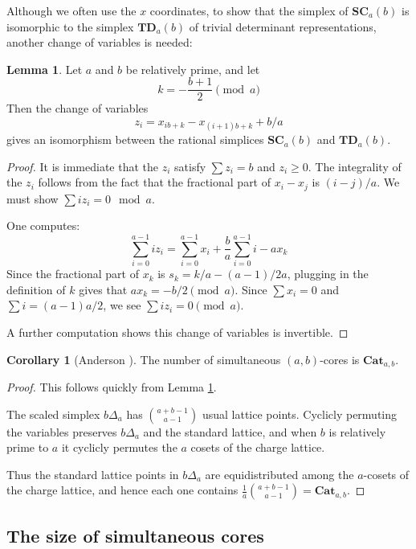 \documentclass{amsart}[12pt]
\theoremstyle{definition}
\newtheorem{lemma}[dummy]{Lemma}
\newtheorem{corollary}[dummy]{Corollary}
\newcommand{\SC}{\mathbf{SC}}
\newcommand{\TD}{\mathbf{TD}}
\newcommand{\Cat}{\mathbf{Cat}}
\begin{document}
Although we often use the $x$ coordinates, to show that the simplex of $\SC_a(b)$ is isomorphic to the simplex $\TD_a(b)$ of trivial determinant representations, another change of variables is needed:
 
\begin{lemma} \label{lem:standardsimplex}
Let $a$ and $b$ be relatively prime, and let 
$$k=-\frac{b+1}{2}\pmod a$$
  Then the change of variables
$$z_i=x_{ib+k}-x_{(i+1)b+k}+b/a$$
gives an isomorphism between the rational simplices $\SC_a(b)$ and $\TD_a(b)$. 
\end{lemma}

\begin{proof}
It is immediate that the $z_i$ satisfy $\sum z_i=b$ and $z_i\geq 0$.  The integrality of the $z_i$ follows from the fact that the fractional part of $x_i-x_j$ is $(i-j)/a$.  We must show $\sum iz_i=0\mod a$.

One computes:
$$\sum_{i=0}^{a-1} iz_i=\sum_{i=0}^{a-1} x_i+\frac{b}{a}\sum_{i=0}^{a-1} i -ax_k$$
Since the fractional part of $x_k$ is $s_k=k/a-(a-1)/2a$, plugging in the definition of $k$ gives that $ax_k=-b/2\pmod a$.  Since $\sum x_i=0$ and $\sum i=(a-1)a/2$, we see $\sum iz_i=0\pmod a$.

A further computation shows this change of variables is invertible.
\end{proof}


\begin{corollary}[Anderson \cite{anderson}] \label{cor:anderson} The number of simultaneous $(a,b)$-cores is $\Cat_{a,b}$.
\end{corollary}

\begin{proof} This follows quickly from Lemma \ref{lem:standardsimplex}.


The scaled simplex $b\Delta_a$ has $\binom{a+b-1}{a-1}$
  usual lattice points.  Cyclicly permuting the variables preserves
  $b\Delta_a$ and the standard lattice, and when $b$ is relatively prime to $a$ it cyclicly permutes the $a$ cosets of the charge lattice.   

Thus the standard lattice points in
  $b\Delta_a$ are equidistributed among the $a$-cosets of the
  charge lattice, and hence each one contains $\frac{1}{a}\binom{a+b-1}{a-1}=\Cat_{a,b}$.


\end{proof}

\subsection{The size of simultaneous cores}
\end{document}
